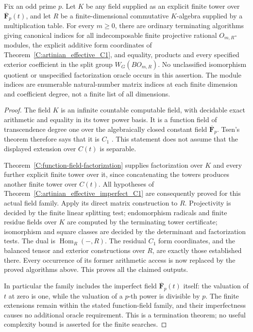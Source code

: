 \begin{theorem}
\label{C:function-field-WG}
Fix an odd prime $p$. Let $K$ be any field supplied as
an explicit finite tower over
$\overline{\mathbf F}_p(t)$, and let $R$ be a
finite-dimensional commutative $K$-algebra supplied
by a multiplication table. For every $m\geq0$,
there are ordinary terminating algorithms giving
canonical indices for all indecomposable finite
projective rational $O_{m,R}$-modules, the explicit
additive form coordinates of
Theorem~\ref{C:artinian_effective_C1}, and equality,
products and every specified exterior coefficient
in the split group $W_G(BO_{m,R})$.
No unclassified isomorphism quotient or unspecified
factorization oracle occurs in this assertion.
The module indices are enumerable natural-number
matrix indices at each finite dimension and coefficient
degree, not a finite list of all dimensions.
\end{theorem}
\begin{proof}
The field $K$ is an infinite countable computable
field, with decidable exact arithmetic and equality
in its tower power basis. It is a function field
of transcendence degree one over the algebraically
closed constant field $\overline{\mathbf F}_p$.
Tsen's theorem therefore says that it is $C_1$
\cite[Theorem 59.67.10, Tag 03RD]{C-StacksTsenFunctionFields}.
This statement does not assume that the displayed
extension over $C(t)$ is separable.

Theorem~\ref{C:function-field-factorization} supplies
factorization over $K$ and every further explicit
finite tower over it, since concatenating the towers
produces another finite tower over $C(t)$.
All hypotheses of
Theorem~\ref{C:artinian_effective_imperfect_C1}
are consequently proved for this actual field family.
Apply its direct matrix construction to $R$.
Projectivity is decided by the finite linear splitting
test; endomorphism radicals and finite residue fields
over $K$ are computed by the terminating tower
certificate; isomorphism and square classes are
decided by the determinant and factorization tests.
The dual is $\operatorname{Hom}_R(-,R)$.
The residual $C_1$ form coordinates, and the balanced
tensor and exterior constructions over $R$, are
exactly those established there. Every occurrence
of its former arithmetic access is now replaced by
the proved algorithms above. This proves all the
claimed outputs.

In particular the family includes the imperfect field
$\overline{\mathbf F}_p(t)$ itself: the valuation
of $t$ at zero is one, while the valuation of a
$p$-th power is divisible by $p$.
The finite extensions remain within the stated
function-field family, and their imperfectness
causes no additional oracle requirement.
This is a termination theorem; no useful complexity
bound is asserted for the finite searches.
\end{proof}
